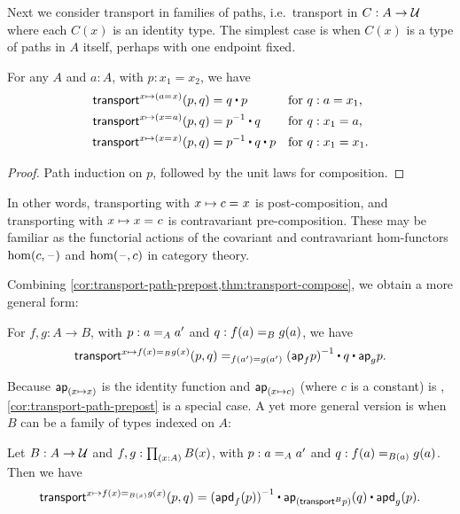 %
Next we consider transport in families of paths, i.e.\ transport in $C:A\to\type$ where each $C(x)$ is an identity type.
The simplest case is when $C(x)$ is a type of paths in $A$ itself, perhaps with one endpoint fixed.

\begin{lem}\label{cor:transport-path-prepost}
  For any $A$ and $a:A$, with $p:x_1=x_2$, we have
  \begin{align*}
    \transfib{x \mapsto (\id{a}{x})} {p} {q} &= q \ct p
    & &\text{for $q:a=x_1$,}\\
    \transfib{x \mapsto (\id{x}{a})} {p} {q} &= \opp {p} \ct q 
    & &\text{for $q:x_1=a$,}\\
    \transfib{x \mapsto (\id{x}{x})} {p} {q} &= \opp{p} \ct q \ct p
    & &\text{for $q:x_1=x_1$.}
  \end{align*}
\end{lem}
\begin{proof}
  Path induction on $p$, followed by the unit laws for composition.
\end{proof}

In other words, transporting with ${x \mapsto \id{c}{x}}$ is post-composition, and transporting with ${x \mapsto \id{x}{c}}$ is contravariant pre-composition.
These may be familiar as the functorial actions of the covariant and contravariant hom-functors $\hom(c, {\blank})$ and $\hom({\blank},c)$ in category theory.

Combining \autoref{cor:transport-path-prepost,thm:transport-compose}, we obtain a more general form:

\begin{thm}\label{thm:transport-path}
  For $f,g:A\to B$, with $p : \id[A]{a}{a'}$ and $q : \id[B]{f(a)}{g(a)}$, we have
  \begin{equation*}
    \id[f(a') = g(a')]{\transfib{x \mapsto \id[B]{f(x)}{g(x)}}{p}{q}}
    {\opp{(\apfunc{f}{p})} \ct q \ct \apfunc{g}{p}}.
  \end{equation*}
\end{thm}

Because $\apfunc{(x \mapsto x)}$ is the identity function and $\apfunc{(x \mapsto c)}$ (where $c$ is a constant) is , \autoref{cor:transport-path-prepost} is a special case.
A yet more general version is when $B$ can be a family of types indexed on $A$:

\begin{thm}\label{thm:transport-path2}
  Let $B : A \to \type$ and $f,g : \prd{x:A} B(x)$, with $p : \id[A]{a}{a'}$ and $q : \id[B(a)]{f(a)}{g(a)}$.
  Then we have
  \begin{equation*}
    \transfib{x \mapsto \id[B(x)]{f(x)}{g(x)}}{p}{q} = 
    \opp{(\apdfunc{f}(p))} \ct \apfunc{(\transfibf{B}{p})}(q) \ct \apdfunc{g}(p).
  \end{equation*}
\end{thm}

